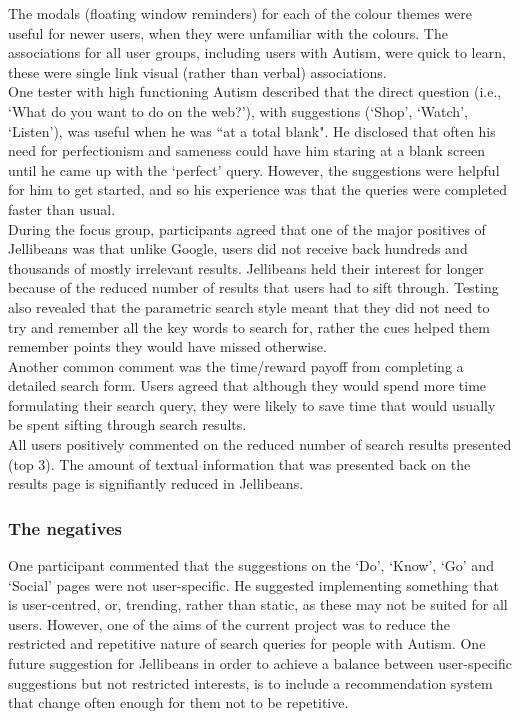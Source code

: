 \documentclass[a4paper, 11pt]{article}
\begin{document}
The modals (floating window reminders) for each of the colour themes were useful for newer users, when they were unfamiliar with the colours. The associations for all user groups, including users with Autism, were quick to learn, these were single link visual (rather than verbal) associations.\\

One tester with high functioning Autism described that the direct question (i.e., `What do you want to do on the web?'), with suggestions (`Shop', `Watch', `Listen'), was useful when he was ``at a total blank". He disclosed that often his need for perfectionism and sameness could have him staring at a blank screen until he came up with the `perfect' query. However, the suggestions were helpful for him to get started, and so his experience was that the queries were completed faster than usual.  \\

During the focus group, participants agreed that one of the major positives of Jellibeans was that unlike Google, users did not receive back hundreds and thousands of mostly irrelevant results. Jellibeans held their interest for longer because of the reduced number of results that users had to sift through. Testing also revealed that the parametric search style meant that they did not need to try and remember all the key words to search for, rather the cues helped them remember points they would have missed otherwise. \\

Another common comment was the time/reward payoff from completing a detailed search form. Users agreed that although they would spend more time formulating their search query, they were likely to save time that would usually be spent sifting through search results.\\

All users positively commented on the reduced number of search results presented (top 3). The amount of textual information that was presented back on the results page is signifiantly reduced in Jellibeans. 


\subsubsection{The negatives}
One participant commented that the suggestions on the `Do', `Know', `Go' and `Social' pages were not user-specific. He suggested implementing something that is user-centred, or, trending, rather than static, as these may not be suited for all users. However, one of the aims of the current project was to reduce the restricted and repetitive nature of search queries for people with Autism. One future suggestion for Jellibeans in order to achieve a balance between user-specific suggestions but not restricted interests, is to include a recommendation system that change often enough for them not to be repetitive. 
\end{document}
